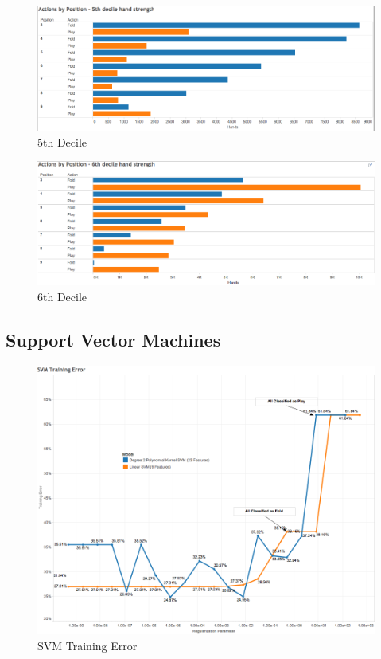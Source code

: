 \documentclass[twoside]{article}
\begin{document}
\begin{multicols}{2}
\begin{figure}[H]
  \centering
  \centerline{\includegraphics[width=1.1\columnwidth]{5thDecile.png}}
   \caption{5th Decile}
  \label{fig:5thDecile}
\end{figure}

\begin{figure}[H]
  \centering
  \centerline{\includegraphics[width=1.1\columnwidth]{6thDecile.png}}
   \caption{6th Decile}
  \label{fig:6thDecile}
\end{figure}

\subsection{Support Vector Machines}



\begin{figure}[H]
  \centering
  \centerline{\includegraphics[width=1\columnwidth]{SVM.png}}
   \caption{SVM Training Error}
  \label{fig:SVM}
\end{figure}


\end{multicols}
\end{document}
